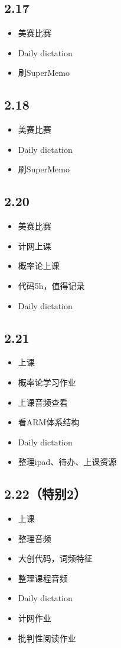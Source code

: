\documentclass[UTF8]{ctexart}
\begin{document}
\subsection*{2.17}
\begin{itemize}
    \item 美赛比赛
    \item Daily dictation
    \item 刷SuperMemo
\end{itemize}
\subsection*{2.18}
\begin{itemize}
    \item 美赛比赛
    \item Daily dictation
    \item 刷SuperMemo
\end{itemize}
\subsection*{2.20}
\begin{itemize}
    \item 美赛比赛
    \item 计网上课
    \item 概率论上课
    \item 代码5h，值得记录
    \item Daily dictation
\end{itemize}
\subsection*{2.21}
\begin{itemize}
    \item 上课
    \item 概率论学习作业
    \item 上课音频查看
    \item 看ARM体系结构
    \item Daily dictation
    \item 整理ipad、待办、上课资源
\end{itemize}
\subsection*{2.22（特别2）}
\begin{itemize}
    \item 上课
    \item 整理音频
    \item 大创代码，词频特征
    \item 整理课程音频
    \item Daily dictation
    \item 计网作业
    \item 批判性阅读作业
\end{itemize}
\end{document}
